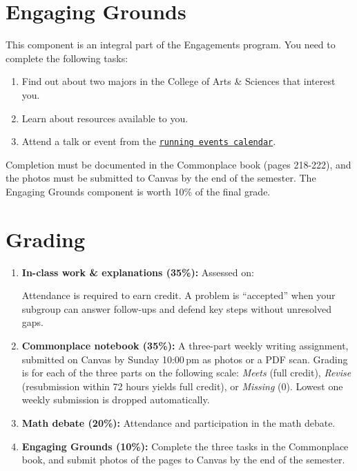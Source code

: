 \documentclass[oneside,11pt]{amsart}
\begin{document}
\section{Engaging Grounds}

This component is an integral part of the Engagements program. You need to complete the 
following tasks:
\begin{enumerate}
\item Find out about two majors in the College of Arts \& Sciences that interest you.

\item Learn about resources available to you. 

\item Attend a talk or event from the \href{https://engagements.as.virginia.edu/engaging-grounds}{\texttt{running events calendar}}. 
\end{enumerate}
Completion must be documented in the Commonplace book (pages 218-222), and the 
photos must be submitted to Canvas by the end of the semester.
The Engaging Grounds component is worth 10\% of the final grade.

\section{Grading}

\begin{enumerate}[$\bullet$]
\item \textbf{In-class work \& explanations (35\%):}
Assessed on:
Attendance is required to earn credit. A problem is ``accepted'' when your subgroup can answer follow-ups and defend key steps without unresolved gaps.

 \item \textbf{Commonplace notebook (35\%):}
	A three-part weekly writing assignment, submitted
	on Canvas by Sunday 10:00\,pm as photos or a PDF scan. 
	Grading is for each of the three parts on the following scale:
	\emph{Meets} (full credit), 
	\emph{Revise} 
	(resubmission within 72 hours yields full credit), or
	\emph{Missing} (0).
	Lowest one weekly submission is dropped
	automatically.

  \item \textbf{Math debate (20\%):}
	Attendance and participation in the math debate.

	\item \textbf{Engaging Grounds (10\%):}
	Complete the three tasks in the Commonplace book, and 
	submit photos of the pages to Canvas by the end of the semester.
\end{enumerate}
\end{document}
